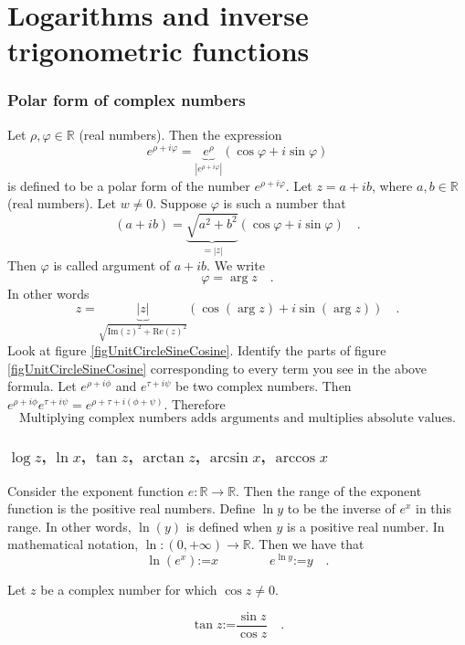 \documentclass[12pt]{book}
\renewcommand{\Im}{\mathrm{Im}}
\renewcommand{\Re}{\mathrm{Re}}
\newcommand{\eqdef}{\textbf{:=}}
\begin{document}
\chapter{Logarithms and inverse trigonometric functions}
\subsection{Polar form of complex numbers}
\label{secPolarFormComplexNumbers}

Let $\rho, \varphi\in \mathbb R$ (real numbers). Then the expression
\[
e^{\rho+i\varphi}=\underbrace{e^{\rho}}_{|e^{\rho+i\varphi}|}(\cos \varphi + i\sin \varphi)
\]
is defined to be a polar form of the number $e^{\rho+i\varphi}$. Let $z=a+ib$, where $a, b\in \mathbb R$ (real numbers). Let $w\neq 0$. Suppose $\varphi$ is such a number that
\[
(a+ib)= \underbrace{\sqrt{a^2+b^2}}_{=|z|}(\cos \varphi + i \sin \varphi)\quad.
\]
Then $\varphi$ is called argument of $a+ib$. We write \[\varphi=\arg z\quad .\] In other words
\[z=\underbrace{|z|}_{\sqrt{\Im(z)^2+\Re(z)^2}}\left(\cos(\arg z) + i\sin (\arg z)\right)\quad .
\]
Look at figure \ref{figUnitCircleSineCosine}. Identify the parts of figure \ref{figUnitCircleSineCosine} corresponding to every term you see in the above formula.
Let $e^{\rho+i\phi}$ and $e^{\tau+i\psi}$ be two complex numbers. Then $e^{\rho+i\phi}e^{\tau+i\psi} = e^{\rho+\tau+i(\phi+\psi)}$. Therefore
\begin{equation}\boxed{
\text{Multiplying complex numbers adds arguments and multiplies absolute values.}
}
\end{equation}

\subsection{$\log z$, $\ln x$, $\tan z$, $\arctan z$, $\arcsin x$, $\arccos x$}
Consider the exponent function $e: \mathbb R \to \mathbb R$. Then the range of the exponent function is the positive real numbers. Define $\ln y$ to be the inverse of $e^x$ in this range. In other words, $\ln(y)$ is defined when $y$ is a positive real number. In mathematical notation, $\ln: (0,+\infty)\to \mathbb R$. Then we have that
\begin{equation}\boxed{
\ln (e^x)\eqdef x\quad\quad \quad \quad  e^{\ln y}\eqdef y\quad .
}
\end{equation}

Let $z$ be a complex number for which $\cos z\neq 0$.

\begin{equation}\boxed{
\tan z\eqdef \frac{\sin z}{\cos z}\quad .
}
\end{equation}
\end{document}
